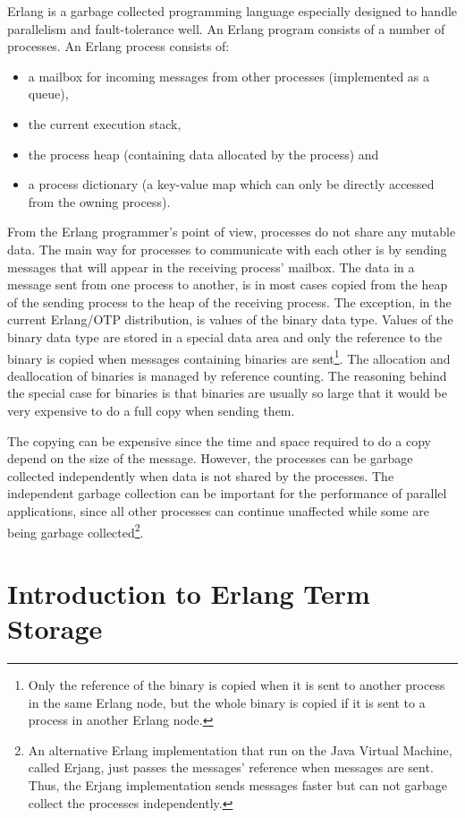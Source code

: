 \documentclass[aps,pre,preprint,nofootinbib]{revtex4}
\begin{document}
Erlang is a garbage collected programming language especially designed to handle parallelism and fault-tolerance well.
An Erlang program consists of a number of processes.
An Erlang process consists of: 
\begin{itemize}
 \item a mailbox for incoming messages from other processes (implemented as a queue),
 \item the current execution stack,
 \item the process heap (containing data allocated by the process) and
 \item a process dictionary (a key-value map which can only be directly accessed from the owning process).
\end{itemize}
From the Erlang programmer's point of view, processes do not share any mutable data.
The main way for processes to communicate with each other is by sending messages that will appear in the receiving process' mailbox.
The data in a message sent from one process to another, is in most cases copied from the heap of the sending process to the heap of the receiving process.
The exception, in the current Erlang/OTP distribution, is values of the binary data type.
Values of the binary data type are stored in a special data area and only the reference to the binary is copied when messages containing binaries are sent\footnote{Only the reference of the binary is copied when it is sent to another process in the same Erlang node, but the whole binary is copied if it is sent to a process in another Erlang node.}.
The allocation and deallocation of binaries is managed by reference counting.
The reasoning behind the special case for binaries is that binaries are usually so large that it would be very expensive to do a full copy when sending them.

The copying can be expensive since the time and space required to do a copy depend on the size of the message.
However, the processes can be garbage collected independently when data is not shared by the processes.
The independent garbage collection can be important for the performance of parallel applications, since all other processes can continue unaffected while some are being garbage collected\footnote{
An alternative Erlang implementation that run on the Java Virtual Machine, called Erjang, just passes the messages' reference when messages are sent.
Thus, the Erjang implementation sends messages faster but can not garbage collect the processes independently.}.

\section{Introduction to Erlang Term Storage}\label{sec:ets_introduction}
\end{document}
